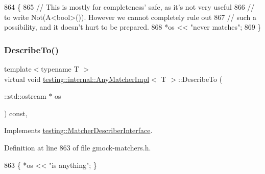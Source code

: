 \begin{DoxyCode}
864                                                         \{
865     \textcolor{comment}{// This is mostly for completeness' safe, as it's not very useful}
866     \textcolor{comment}{// to write Not(A<bool>()).  However we cannot completely rule out}
867     \textcolor{comment}{// such a possibility, and it doesn't hurt to be prepared.}
868     *os << \textcolor{stringliteral}{"never matches"};
869   \}
\end{DoxyCode}
\mbox{\label{classtesting_1_1internal_1_1AnyMatcherImpl_a743f037083cc9992a4cc0d4e9842bc86}} 
\subsubsection{\texorpdfstring{Describe\+To()}{DescribeTo()}}
{\footnotesize\ttfamily template$<$typename T $>$ \\
virtual void \hyperlink{classtesting_1_1internal_1_1AnyMatcherImpl}{testing\+::internal\+::\+Any\+Matcher\+Impl}$<$ T $>$\+::Describe\+To (\begin{DoxyParamCaption}\item[{\+::std\+::ostream $\ast$}]{os }\end{DoxyParamCaption}) const\hspace{0.3cm}{\ttfamily [inline]}, {\ttfamily [virtual]}}



Implements \hyperlink{classtesting_1_1MatcherDescriberInterface_ad9f861588bd969b6e3e717f13bb94e7b}{testing\+::\+Matcher\+Describer\+Interface}.



Definition at line 863 of file gmock-\/matchers.\+h.


\begin{DoxyCode}
863 \{ *os << \textcolor{stringliteral}{"is anything"}; \}
\end{DoxyCode}
\mbox{\label{classtesting_1_1internal_1_1AnyMatcherImpl_ac2d8f01b1c8ede16295f03eda91c5de1}} 
